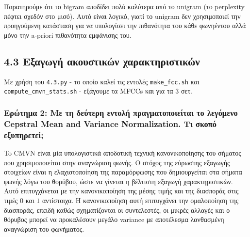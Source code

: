 \documentclass[a4paper, 12pt]{article}
\begin{document}
        
        Παρατηρούμε ότι το bigram αποδίδει πολύ καλύτερα από το unigram (το perplexity πέφτει σχεδόν στο μισό). Αυτό είναι λογικό, γιατί το unigram δεν χρησιμοποιεί την προηγούμενη κατάσταση για να υπολογίσει την πιθανότητα του κάθε φωνηέντου αλλά μόνο την a-priori πιθανότητα εμφάνισης του.
        
    \subsection*{4.3 Εξαγωγή ακουστικών χαρακτηριστικών}
        Με χρήση του \verb|4.3.py| - το οποίο καλεί τις εντολές \verb|make_fcc.sh| και \verb|compute_cmvn_stats.sh| - εξάγουμε τα MFCCs και για τα 3 σετ. 
        
        \subsubsection*{Ερώτημα 2: Με τη δεύτερη εντολή πραγματοποιείται το λεγόμενο Cepstral Mean and Variance Normalization. Τι σκοπό εξυπηρετεί;}
            To CMVN είναι μία υπολογιστικά αποδοτική τεχνική κανονικοποίησης του σήματος που χρησιμοποιείται στην αναγνώριση φωνής. Ο στόχος της εύρωστης εξαγωγής στοιχείων είναι η ελαχιστοποίηση της παραμόρφωσης που δημιουργείται στα σήματα φωνής λόγω του θορύβου, ώστε να γίνεται η βέλτιστη εξαγωγή χαρακτηριστικών. Αυτό επιτυγχάνεται με την κανονικοποίηση της μέσης τιμής και της διασποράς στις τιμές $0$ και $1$ αντίστοιχα. Η κανονικοποίηση αυτή επιτυγχάνει την ομαλοποίηση της διασποράς, επειδή καθώς σχηματίζονται οι συντελεστές, οι μικρές αλλαγές και ο θόρυβος μπορεί να προκαλέσουν μεγάλο variance με αποτέλεσμα λανθασμένη αναγνώριση του φωνήματος. 
            
            
            
            
            
        
\end{document}
